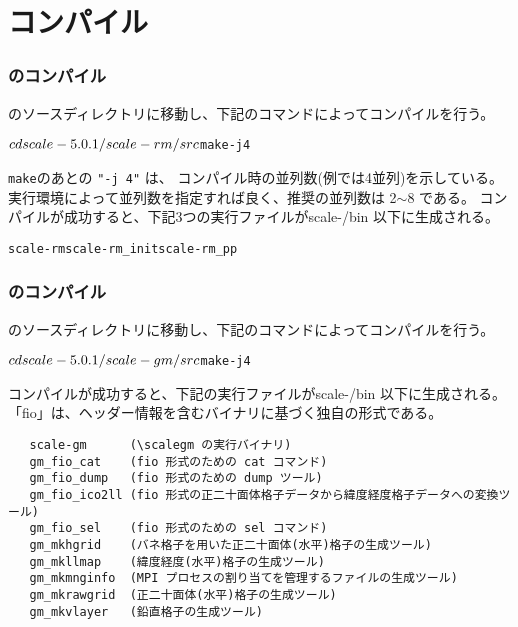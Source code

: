 \section{コンパイル} %

\subsubsection{\scalerm のコンパイル}

\scalerm のソースディレクトリに移動し、下記のコマンドによってコンパイルを行う。
\begin{alltt}
 $ cd scale-{\version}/scale-rm/src
 $ make -j 4
\end{alltt}
\verb|make|のあとの \verb|"-j 4"| は、
コンパイル時の並列数(例では4並列)を示している。
実行環境によって並列数を指定すれば良く、推奨の並列数は 2$\sim$8 である。
コンパイルが成功すると、下記3つの実行ファイルがscale-{\version}/bin 以下に生成される。
\begin{alltt}
 scale-rm  scale-rm_init  scale-rm_pp
\end{alltt}

\subsubsection{{\scalegm}のコンパイル} %

{\scalegm}のソースディレクトリに移動し、下記のコマンドによってコンパイルを行う。
\begin{alltt}
  $  cd scale-{\version}/scale-gm/src
  $  make -j 4
\end{alltt}
コンパイルが成功すると、下記の実行ファイルがscale-{\version}/bin 以下に生成される。
「fio」は、ヘッダー情報を含むバイナリに基づく独自の形式である。
\begin{verbatim}
   scale-gm      (\scalegm の実行バイナリ)
   gm_fio_cat    (fio 形式のための cat コマンド)
   gm_fio_dump   (fio 形式のための dump ツール)
   gm_fio_ico2ll (fio 形式の正二十面体格子データから緯度経度格子データへの変換ツール)
   gm_fio_sel    (fio 形式のための sel コマンド)
   gm_mkhgrid    (バネ格子を用いた正二十面体(水平)格子の生成ツール)
   gm_mkllmap    (緯度経度(水平)格子の生成ツール)
   gm_mkmnginfo  (MPI プロセスの割り当てを管理するファイルの生成ツール)
   gm_mkrawgrid  (正二十面体(水平)格子の生成ツール)
   gm_mkvlayer   (鉛直格子の生成ツール)
\end{verbatim}


